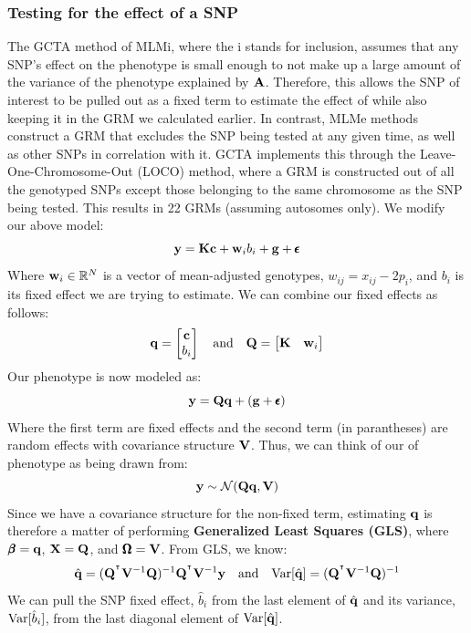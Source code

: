\documentclass[12pt]{article}
\begin{document}
\subsubsection{Testing for the effect of a SNP}
The GCTA method of MLMi, where the i stands for inclusion, assumes that any SNP's effect on the phenotype is small enough to not make up a large amount of the variance of the phenotype explained by $\mathbf{A}$.
Therefore, this allows the SNP of interest to be pulled out as a fixed term to estimate the effect of while also keeping it in the GRM we calculated earlier.
In contrast, MLMe methods construct a GRM that excludes the SNP being tested at any given time, as well as other SNPs in correlation with it.
GCTA implements this through the Leave-One-Chromosome-Out (LOCO) method, where a GRM is constructed out of all the genotyped SNPs except those belonging to the same chromosome as the SNP being tested.
This results in 22 GRMs (assuming autosomes only).
We modify our above model:
$$ \mathbf{y} = \mathbf{K} \mathbf{c} + \mathbf{w}_i b_i + \mathbf{g} + \pmb{\epsilon} $$
Where $\mathbf{w}_i \in \mathbb{R}^N$ is a vector of mean-adjusted genotypes, $w_{ij} = x_{ij} - 2 p_i$, and $b_i$ is its fixed effect we are trying to estimate. We can combine our fixed effects as follows:
\begin{equation*}
\mathbf{q} = \begin{bmatrix} \mathbf{c} \\ b_i \end{bmatrix}
\quad\mathrm{and}\quad
\mathbf{Q} = \begin{bmatrix} \mathbf{K} & \mathbf{w}_i \end{bmatrix}
\end{equation*}
Our phenotype is now modeled as:
$$ \mathbf{y} = \mathbf{Q} \mathbf{q} + (\mathbf{g} + \pmb{\epsilon}) $$
Where the first term are fixed effects and the second term (in parantheses) are random effects with covariance structure $\mathbf{V}$. Thus, we can think of our of phenotype as being drawn from:
$$ \mathbf{y} \sim \mathcal{N} (\mathbf{Q} \mathbf{q}, \mathbf{V}) $$
Since we have a covariance structure for the non-fixed term, estimating $\mathbf{q}$ is therefore a matter of performing \textbf{Generalized Least Squares (GLS)}, where $\pmb{\beta} = \mathbf{q}$, $\mathbf{X} = \mathbf{Q}$, and $\pmb{\Omega} = \mathbf{V}$. From GLS, we know:
\begin{equation*}
    \hat{\mathbf{q}} = (\mathbf{Q}^{^\intercal} \mathbf{V}^{-1} \mathbf{Q})^{-1} \mathbf{Q}^{^\intercal} \mathbf{V}^{-1} \mathbf{y}
    \quad\mathrm{and}\quad
    \mathrm{Var}[\hat{\mathbf{q}}] = (\mathbf{Q}^{^\intercal} \mathbf{V}^{-1} \mathbf{Q})^{-1}
\end{equation*}
We can pull the SNP fixed effect, $\hat{b}_i$ from the last element of $\hat{\mathbf{q}}$ and its variance, $\mathrm{Var}[\hat{b}_i]$, from the last diagonal element of $\mathrm{Var}[\hat{\mathbf{q}}]$.
\end{document}

